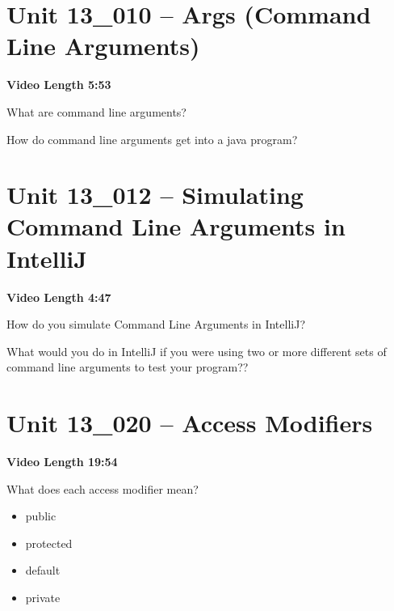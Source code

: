 \documentclass[letterpaper,12pt]{exam}
\newcommand{\unit}{Unit 13}
\begin{document}
\section*{\unit\_010 -- Args (Command Line Arguments)} 
\par{\selectfont\textbf{Video Length 5:53}}
\begin{questions}
\begin{samepage}
    \question What are command line arguments?
    \vspace{5mm}
\end{samepage}
\begin{samepage}
    \question How do command line arguments get into a java program?
    \vspace{5mm}
\end{samepage}

\section*{\unit\_012 -- Simulating Command Line Arguments in IntelliJ} 
\par{\selectfont\textbf{Video Length 4:47}}

\begin{samepage}
    \question How do you simulate Command Line Arguments in IntelliJ?
    \vspace{5mm}
\end{samepage}

\begin{samepage}
    \question What would you do in IntelliJ if you were using two or more different sets of command line arguments to test your program??
    \vspace{5mm}
\end{samepage}
\section*{\unit\_020 -- Access Modifiers} 
\par{\selectfont\textbf{Video Length 19:54 }}

\begin{samepage}
    \question What does each access modifier mean?
      \begin{itemize}
        \item public
        \vspace{5mm}
        \item protected
        \vspace{5mm}
        \item default
        \vspace{5mm}
        \item private
        \vspace{5mm}
       \end{itemize}
\end{samepage}


\end{questions}
\end{document}
